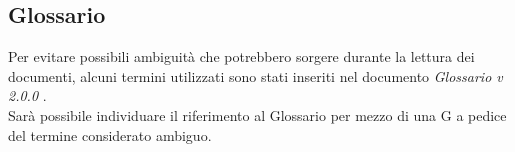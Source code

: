 \subsection{Glossario}
Per evitare possibili ambiguità che potrebbero sorgere durante la lettura dei documenti,
alcuni termini utilizzati sono stati inseriti nel documento \textit{Glossario v 2.0.0 }. \\
Sarà possibile individuare il riferimento al Glossario per mezzo
di una G a pedice del termine considerato ambiguo.